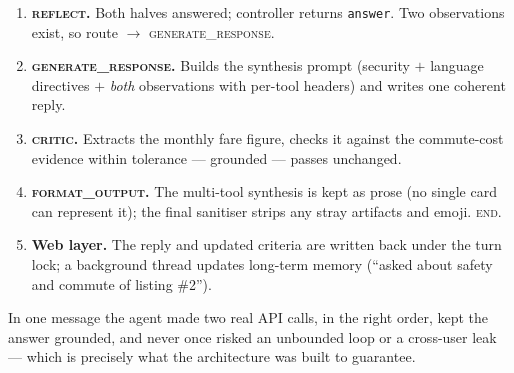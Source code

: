 \documentclass[11pt,a4paper]{article}
\newcommand{\code}[1]{\texttt{\small #1}}
\newcommand{\gnode}[1]{\textsc{#1}}  %
\begin{document}
\begin{enumerate}[leftmargin=1.6em,itemsep=3pt]
        geocodable address), calls TfL, returns time $+$ monthly fare. Loopable, no
        error $\to$ \gnode{reflect}.
  \item \textbf{\gnode{reflect}.} Both halves answered; controller returns
        \code{answer}. Two observations exist, so route $\to$ \gnode{generate\_response}.
  \item \textbf{\gnode{generate\_response}.} Builds the synthesis prompt (security $+$
        language directives $+$ \emph{both} observations with per-tool headers) and
        writes one coherent reply.
  \item \textbf{\gnode{critic}.} Extracts the monthly fare figure, checks it against the
        commute-cost evidence within tolerance --- grounded --- passes unchanged.
  \item \textbf{\gnode{format\_output}.} The multi-tool synthesis is kept as prose (no
        single card can represent it); the final sanitiser strips any stray artifacts
        and emoji. \gnode{end}.
  \item \textbf{Web layer.} The reply and updated criteria are written back under the
        turn lock; a background thread updates long-term memory
        (``asked about safety and commute of listing \#2'').
\end{enumerate}

\noindent In one message the agent made two real API calls, in the right order, kept
the answer grounded, and never once risked an unbounded loop or a cross-user leak ---
which is precisely what the architecture was built to guarantee.

\end{document}
